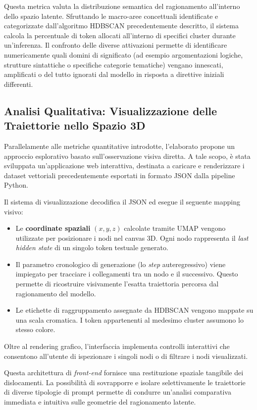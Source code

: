 Questa metrica valuta la distribuzione semantica del ragionamento all'interno dello spazio latente. Sfruttando le macro-aree concettuali identificate e categorizzate dall'algoritmo HDBSCAN precedentemente descritto, il sistema calcola la percentuale di token allocati all'interno di specifici cluster durante un'inferenza. Il confronto delle diverse attivazioni permette di identificare numericamente quali domini di significato (ad esempio argomentazioni logiche, strutture sintattiche o specifiche categorie tematiche) vengano innescati, amplificati o del tutto ignorati dal modello in risposta a direttive iniziali differenti.

\subsection{Analisi Qualitativa: Visualizzazione delle Traiettorie nello Spazio 3D}
\label{sec:analisi_qualitativa}

Parallelamente alle metriche quantitative introdotte, l'elaborato propone un approccio esplorativo basato sull'osservazione visiva diretta. A tale scopo, è stata sviluppata un'applicazione web interattiva, destinata a caricare e renderizzare i dataset vettoriali precedentemente esportati in formato JSON dalla pipeline Python.

Il sistema di visualizzazione decodifica il JSON ed esegue il seguente mapping visivo:
\begin{itemize}
    \item Le \textbf{coordinate spaziali} $(x, y, z)$ calcolate tramite UMAP vengono utilizzate per posizionare i nodi nel canvas 3D. Ogni nodo rappresenta il \textit{last hidden state} di un singolo token testuale generato.
    \item Il parametro cronologico di generazione (lo \textit{step} auteregressivo) viene impiegato per tracciare i collegamenti tra un nodo e il successivo. Questo permette di ricostruire visivamente l'esatta traiettoria percorsa dal ragionamento del modello.
    \item Le etichette di raggruppamento assegnate da HDBSCAN vengono mappate su una scala cromatica. I token appartenenti al medesimo cluster assumono lo stesso colore.
\end{itemize}

Oltre al rendering grafico, l'interfaccia implementa controlli interattivi che consentono all'utente di ispezionare i singoli nodi o di filtrare i nodi visualizzati.

Questa architettura di \textit{front-end} fornisce una restituzione spaziale tangibile dei dislocamenti. La possibilità di sovrapporre e isolare selettivamente le traiettorie di diverse tipologie di prompt permette di condurre un'analisi comparativa immediata e intuitiva sulle geometrie del ragionamento latente.
